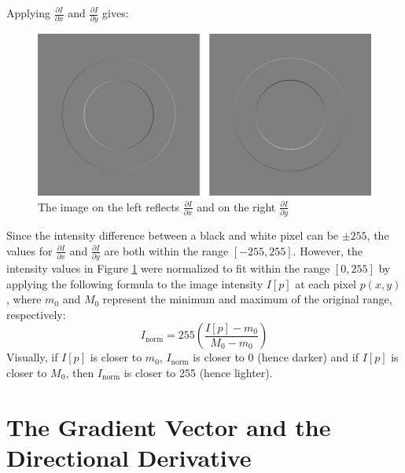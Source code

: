 \documentclass{article}
\begin{document}
Applying $\frac{\partial I}{\partial x}$ and $\frac{\partial I}{\partial y}$ gives:

\begin{figure}[!hbtp]
    \centering
    \includegraphics[width=\linewidth]{figures/figure07.png}
    \caption{The image on the left reflects $\frac{\partial I}{\partial x}$ and on the right $\frac{\partial I}{\partial y}$}
    \label{fig:figure 7}
\end{figure}

Since the intensity difference between a black and white pixel can be $\pm255$, the values for $\frac{\partial I}{\partial x}$ and $\frac{\partial I}{\partial y}$ are both within the range $[-255,255]$. However, the intensity values in Figure \ref{fig:figure 7} were normalized to fit within the range $[0,255]$ by applying the following formula to the image intensity $I[p]$ at each pixel $p(x,y)$, where $m_0$ and $M_0$ represent the minimum and maximum of the original range, respectively:
\begin{equation}
    I_\text{norm} = 255 \left( \frac{I[p] - m_0}{M_0 - m_0} \right) \nonumber
\end{equation}
Visually, if $I[p]$ is closer to $m_0$, $I_\text{norm}$ is closer to 0 (hence darker) and if $I[p]$ is closer to $M_0$, then $I_\text{norm}$ is closer to 255 (hence lighter).

\section{The Gradient Vector and the Directional Derivative}
\setcounter{equation}{0}
\end{document}
